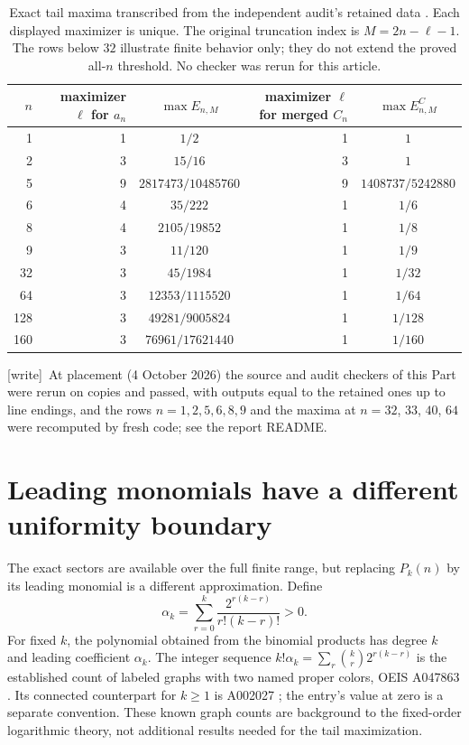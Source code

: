\documentclass[11pt]{article}
\theoremstyle{definition}
\theoremstyle{remark}
\newcommand{\wtag}{\textup{[write]}}
\begin{document}
\begin{table}[t]
\centering
\small
\setlength{\tabcolsep}{8pt}
\begin{tabular}{r r c r c}
\toprule
$n$ & maximizer $\ell$ for $a_n$ & $\max E_{n,M}$
 & maximizer $\ell$ for merged $C_n$ & $\max E^C_{n,M}$\\
\midrule
1   & 1 & $1/2$             & 1 & $1$\\
2   & 3 & $15/16$           & 3 & $1$\\
5   & 9 & $2817473/10485760$& 9 & $1408737/5242880$\\
6   & 4 & $35/222$          & 1 & $1/6$\\
8   & 4 & $2105/19852$      & 1 & $1/8$\\
9   & 3 & $11/120$          & 1 & $1/9$\\
32  & 3 & $45/1984$         & 1 & $1/32$\\
64  & 3 & $12353/1115520$   & 1 & $1/64$\\
128 & 3 & $49281/9005824$   & 1 & $1/128$\\
160 & 3 & $76961/17621440$  & 1 & $1/160$\\
\bottomrule
\end{tabular}
\caption{Exact tail maxima transcribed from the independent audit's retained data
\cite{us-audit}. Each displayed maximizer
is unique. The original truncation index is $M=2n-\ell-1$.
The rows below $32$ illustrate finite behavior only; they do not extend
the proved all-$n$ threshold. No checker was rerun for this article.}
\label{cta:us:tab:exact}
\end{table}

\wtag\ At placement (4 October 2026) the source and audit checkers of this
Part were rerun on copies and passed, with outputs equal to the retained
ones up to line endings, and the rows $n=1,2,5,6,8,9$ and the maxima at
$n=32$, $33$, $40$, $64$ were recomputed by fresh code; see the report
README.

\section{Leading monomials have a different uniformity boundary}\label{cta:us:sec:monomials}

The exact sectors are available over the full finite range, but replacing
$P_k(n)$ by its leading monomial is a different approximation. Define
\begin{equation}\label{cta:us:eq:alpha}
 \alpha_k=\sum_{r=0}^k\frac{2^{r(k-r)}}{r!(k-r)!}>0.
\end{equation}
For fixed $k$, the polynomial obtained from the binomial products has
degree $k$ and leading coefficient $\alpha_k$. The integer sequence
$k!\alpha_k=\sum_r\binom kr2^{r(k-r)}$ is the established count of
labeled graphs with two named proper colors, OEIS A047863
\cite{colored}. Its connected counterpart for $k\ge1$ is A002027
\cite{connected}; the entry's value at zero is a separate convention.
These known graph counts are background to the fixed-order logarithmic
theory, not additional results needed for the tail maximization.
\end{document}
